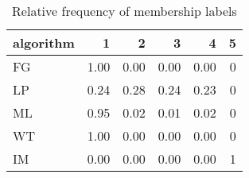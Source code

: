 \begin{table*}

\caption{Relative frequency of membership labels}
\centering
\begin{tabular}[t]{l|r|r|r|r|r}
\hline
algorithm & 1 & 2 & 3 & 4 & 5\\
\hline
FG & 1.00 & 0.00 & 0.00 & 0.00 & 0\\
\hline
LP & 0.24 & 0.28 & 0.24 & 0.23 & 0\\
\hline
ML & 0.95 & 0.02 & 0.01 & 0.02 & 0\\
\hline
WT & 1.00 & 0.00 & 0.00 & 0.00 & 0\\
\hline
IM & 0.00 & 0.00 & 0.00 & 0.00 & 1\\
\hline
\end{tabular}
\end{table*}
